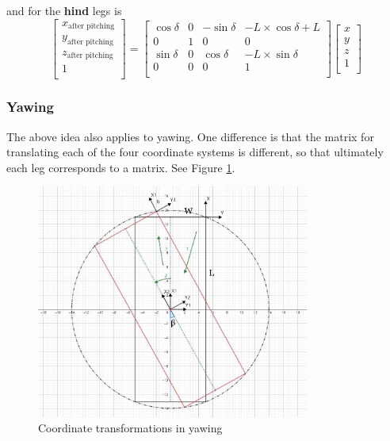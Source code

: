 and for the \textbf{hind} legs is
\begin{equation}
   \begin{bmatrix}
   x_\text{after pitching} \\
   y_\text{after pitching} \\
   z_\text{after pitching} \\
   1                       \\
   \end{bmatrix}
   =
   \begin{bmatrix}
   \cos\delta & 0 & -\sin\delta & -L \times \cos\delta + L \\
   0 & 1 & 0 & 0 \\
   \sin\delta & 0 & \cos\delta & -L \times \sin\delta \\
   0 & 0 & 0 & 1 \\
   \end{bmatrix}
   \begin{bmatrix}
   x \\
   y \\
   z \\
   1 \\
   \end{bmatrix}
\end{equation}

\subsubsection{Yawing}

The above idea also applies to yawing. One difference is that the matrix for translating each of the four coordinate systems is different, so that ultimately each leg corresponds to a matrix. See Figure \ref{fig:coordinate_transformations_in_yawing}.

\begin{figure}[htbp]
   \centering
   \includegraphics[width=0.8\textwidth]{figures/coordinate_transformations_in_yawing.jpg}
   \caption{Coordinate transformations in yawing}
   \label{fig:coordinate_transformations_in_yawing}
\end{figure}

